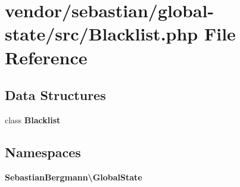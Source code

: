 \section{vendor/sebastian/global-\/state/src/\+Blacklist.php File Reference}
\label{sebastian_2global-state_2src_2_blacklist_8php}
\subsection*{Data Structures}
\begin{DoxyCompactItemize}
\item 
class {\bf Blacklist}
\end{DoxyCompactItemize}
\subsection*{Namespaces}
\begin{DoxyCompactItemize}
\item 
 {\bf Sebastian\+Bergmann\textbackslash{}\+Global\+State}
\end{DoxyCompactItemize}

